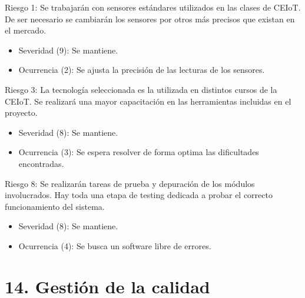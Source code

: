 \documentclass[
11pt, %
]{charter}
\begin{document}
Riesgo 1: Se trabajarán con sensores estándares utilizados en las clases de CEIoT. De ser necesario se cambiarán los sensores por otros más precisos que existan en el mercado.
\begin{itemize}
	\item Severidad (9): Se mantiene.
	\item Ocurrencia (2): Se ajusta la precisión de las lecturas de los sensores.
\end{itemize}   


Riesgo 3: La tecnología seleccionada es la utilizada en distintos cursos de la CEIoT. Se realizará una mayor capacitación en las herramientas incluidas en el proyecto.
\begin{itemize}
	\item Severidad (8): Se mantiene.
	\item Ocurrencia (3): Se espera resolver de forma optima las dificultades encontradas.
\end{itemize}   
 
Riesgo 8: Se realizarán tareas de prueba y depuración de los módulos involucrados. Hay toda una etapa de testing dedicada a probar el correcto funcionamiento del sistema.
\begin{itemize}
	\item Severidad (8): Se mantiene.
	\item Ocurrencia (4): Se busca un software libre de errores.
\end{itemize}   



\section{14. Gestión de la calidad}
\label{sec:calidad}

\end{document}
